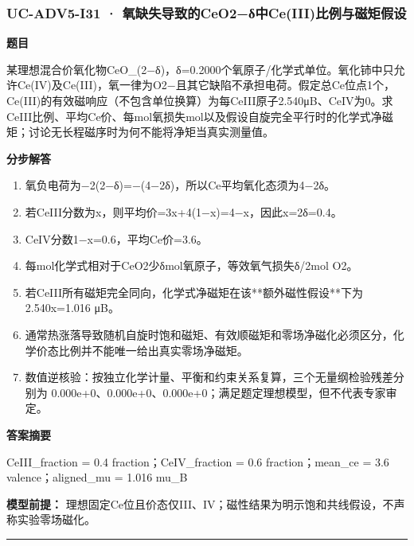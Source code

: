 \documentclass[UTF8,11pt,a4paper]{ctexart}
\begin{document}
\subsubsection*{UC-ADV5-I31 · 氧缺失导致的CeO2−δ中Ce(III)比例与磁矩假设}
\noindent\textbf{题目}\par
某理想混合价氧化物CeO\_(2−δ)，δ=0.2000个氧原子/化学式单位。氧化铈中只允许Ce(IV)及Ce(III)，氧一律为O2−且其它缺陷不承担电荷。假定总Ce位点1个，Ce(III)的有效磁响应（不包含单位换算）为每CeIII原子2.540μB、CeIV为0。求CeIII比例、平均Ce价、每mol氧损失mol以及假设自旋完全平行时的化学式净磁矩；讨论无长程磁序时为何不能将净矩当真实测量值。\par
\medskip\noindent\textbf{分步解答}
\begin{enumerate}
\item 氧负电荷为−2(2−δ)=−(4−2δ)，所以Ce平均氧化态须为4−2δ。
\item 若CeIII分数为x，则平均价=3x+4(1−x)=4−x，因此x=2δ=0.4。
\item CeIV分数1−x=0.6，平均Ce价=3.6。
\item 每mol化学式相对于CeO2少δmol氧原子，等效氧气损失δ/2mol O2。
\item 若CeIII所有磁矩完全同向，化学式净磁矩在该**额外磁性假设**下为2.540x=1.016 μB。
\item 通常热涨落导致随机自旋时饱和磁矩、有效顺磁矩和零场净磁化必须区分，化学价态比例并不能唯一给出真实零场净磁矩。
\item 数值逆核验：按独立化学计量、平衡和约束关系复算，三个无量纲检验残差分别为 0.000e+0、0.000e+0、0.000e+0；满足题定理想模型，但不代表专家审定。
\end{enumerate}
\noindent\textbf{答案摘要}\par
CeIII\_fraction = 0.4 fraction；CeIV\_fraction = 0.6 fraction；mean\_ce = 3.6 valence；aligned\_mu = 1.016 mu\_B\par
\noindent\textbf{模型前提：}
理想固定Ce位且价态仅III、IV；磁性结果为明示饱和共线假设，不声称实验零场磁化。\par
\medskip\hrule\medskip
{}
\end{document}
